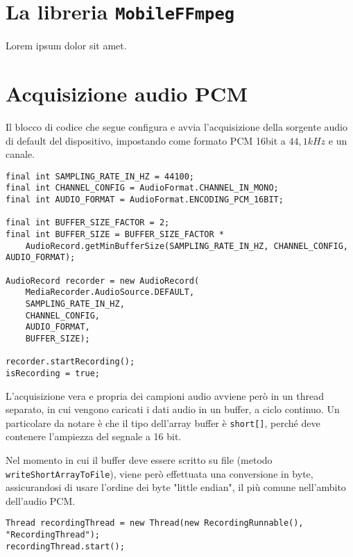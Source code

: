 \chapter{La libreria \texttt{MobileFFmpeg}}
\label{cha:allegato_ffmpeg}

Lorem ipsum dolor sit amet.

\chapter{Acquisizione audio PCM}
\label{cha:allegato_pcm}

Il blocco di codice che segue configura e avvia l'acquisizione della sorgente audio di default del dispositivo, impostando come formato PCM 16bit a $44,1 kHz$ e un canale.

\begin{verbatim}
final int SAMPLING_RATE_IN_HZ = 44100;
final int CHANNEL_CONFIG = AudioFormat.CHANNEL_IN_MONO;
final int AUDIO_FORMAT = AudioFormat.ENCODING_PCM_16BIT;

final int BUFFER_SIZE_FACTOR = 2;
final int BUFFER_SIZE = BUFFER_SIZE_FACTOR *
    AudioRecord.getMinBufferSize(SAMPLING_RATE_IN_HZ, CHANNEL_CONFIG, AUDIO_FORMAT);

AudioRecord recorder = new AudioRecord(
    MediaRecorder.AudioSource.DEFAULT,
    SAMPLING_RATE_IN_HZ,
    CHANNEL_CONFIG,
    AUDIO_FORMAT,
    BUFFER_SIZE);

recorder.startRecording();
isRecording = true;
\end{verbatim}

L'acquisizione vera e propria dei campioni audio avviene però in un thread separato, in cui vengono caricati i dati audio in un buffer, a ciclo continuo. Un particolare da notare è che il tipo dell'array buffer è \texttt{short[]}, perché deve contenere l'ampiezza del segnale a 16 bit.

Nel momento in cui il buffer deve essere scritto su file (metodo \texttt{writeShortArrayToFile}), viene però effettuata una conversione in byte, assicurandosi di usare l'ordine dei byte "little endian", il più comune nell'ambito dell'audio PCM.

\begin{verbatim}
Thread recordingThread = new Thread(new RecordingRunnable(), "RecordingThread");
recordingThread.start();
\end{verbatim}

